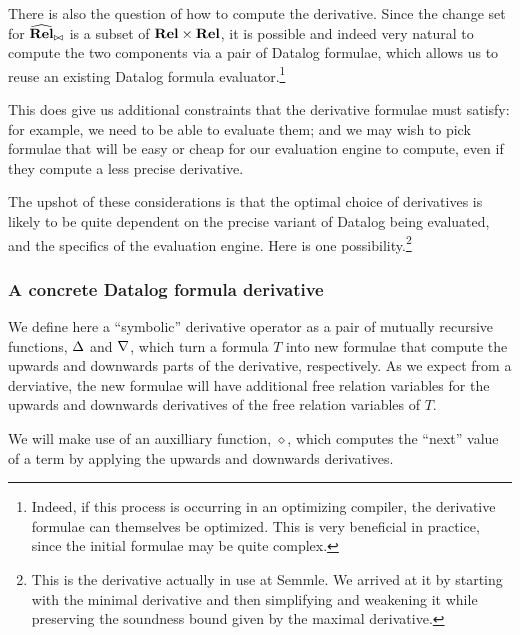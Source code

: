 There is also the question of how to compute the derivative. Since the change
set for $\widehat{\mathbf{Rel}}_{\bowtie}$ is a subset of $\mathbf{Rel} \times \mathbf{Rel}$, it
is possible and indeed very natural to compute the two components via a pair of
Datalog formulae, which allows us to reuse an existing Datalog formula
evaluator.\footnote{
  Indeed, if this process is occurring in an optimizing compiler,
  the derivative formulae can themselves be optimized. This is very 
  beneficial in practice, since the initial formulae may be quite complex.}

This does give us additional constraints that the derivative formulae must satisfy:
for example, we need to be able to evaluate them; and we may wish to pick formulae that will be easy or cheap
for our evaluation engine to compute, even if they compute a less precise derivative.

The upshot of these considerations is that the optimal choice of derivatives is likely
to be quite dependent on the precise variant of Datalog being evaluated, and the
specifics of the evaluation engine. Here is one possibility.\footnote{This is
  the derivative actually in use at Semmle. We arrived at it by starting with the
  minimal derivative and then simplifying and weakening it while preserving the
  soundness bound given by the maximal derivative.}

\subsubsection{A concrete Datalog formula derivative}

We define here a ``symbolic'' derivative operator as a pair of mutually recursive functions,
$\Delta$ and $\nabla$, which turn a formula $T$ into new formulae that compute
the upwards and downwards parts of the derivative, respectively. As we expect
from a derviative, the new formulae will have additional free relation variables
for the upwards and downwards derivatives of the free relation variables of $T$.

\newcommand{\bothdiff}{\diamond}

We will make use of an auxilliary function, $\bothdiff$, which computes the
``next'' value of a term by applying the upwards and downwards derivatives.

